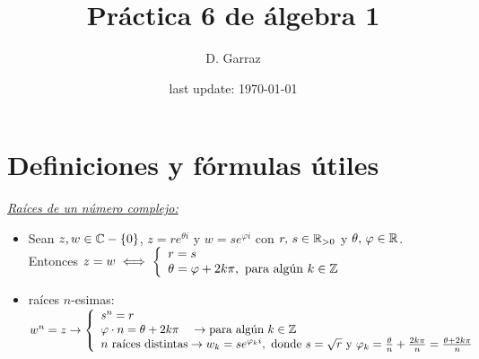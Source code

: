 \documentclass[12pt,a4paper, spanish]{article}
\begin{document}

\pagestyle{empty} %

\title{Práctica 6 de álgebra 1} %
\author{D. Garraz} %
\date{last update: \today} %

\maketitle  %

\newpage
\section{Definiciones y fórmulas útiles}
\textit{\underline{Raíces de un número complejo: }}
\begin{itemize}
	\item Sean $z, w \en \complejos -\set{0}$, $z = re^{\theta i}$ y $w = se^{\varphi i }$ con $r,\, s \en \reales_{>0}$
	      y $\theta,\, \varphi \en \reales$.\\ Entonces $z = w \sisolosi
		      \llave{l}{
			      r = s\\
			      \theta = \varphi + 2 k\pi,\ \text{para algún } k \en \enteros
		      }$
	\item raíces $n$-esimas: $w^n = z
		      \to
		      \llave{l}{
		      s^n = r \\
		      \varphi \cdot n = \theta + 2 k \pi \quad\to \text{para algún $k\en \enteros$}\\
		      \text{$n$ raíces distintas} \to w_k=se^{\varphi_k i}, \text{ donde } s = \sqrt{r} \text{ y }
		      \varphi_k = \frac{\theta}{n} + \frac{2k\pi}{n} = \frac{\theta + 2k\pi}{n}


		      }$
\end{itemize}
\end{document}
